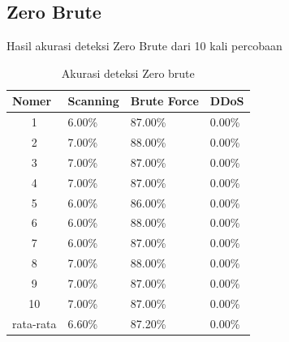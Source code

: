 \subsection{Zero Brute}
Hasil akurasi deteksi Zero Brute dari 10 kali percobaan
\begin{table}[H]
	\centering
	\caption{Akurasi deteksi Zero brute}
	\label{my-label}
	\begin{tabular}{|c|l|l|l|}
		\hline
		\multicolumn{1}{|l|}{Nomer}     & Scanning & Brute Force & DDoS   \\ \hline
		1                               & 6.00\%   & 87.00\%     & 0.00\% \\ \hline
		2                               & 7.00\%   & 88.00\%     & 0.00\% \\ \hline
		3                               & 7.00\%   & 87.00\%     & 0.00\% \\ \hline
		4                               & 7.00\%   & 87.00\%     & 0.00\% \\ \hline
		5                               & 6.00\%   & 86.00\%     & 0.00\% \\ \hline
		6                               & 6.00\%   & 88.00\%     & 0.00\% \\ \hline
		7                               & 6.00\%   & 87.00\%     & 0.00\% \\ \hline
		8                               & 7.00\%   & 88.00\%     & 0.00\% \\ \hline
		9                               & 7.00\%   & 87.00\%     & 0.00\% \\ \hline
		10                              & 7.00\%   & 87.00\%     & 0.00\% \\ \hline
		\multicolumn{1}{|l|}{rata-rata} & 6.60\%   & 87.20\%     & 0.00\% \\ \hline
	\end{tabular}
\end{table}

